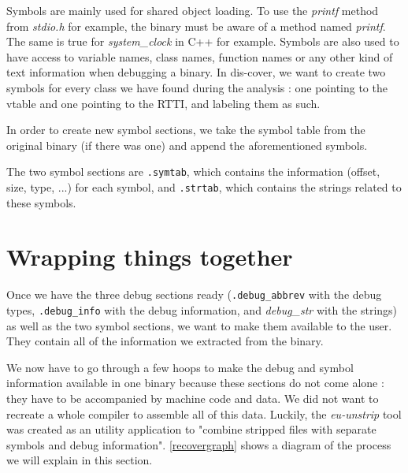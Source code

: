 \documentclass[a4paper,11pt,oneside]{report}
\begin{document}
Symbols are mainly used for shared object loading. To use the \emph{printf}
method from \emph{stdio.h} for example, the binary must be aware of a
method named \emph{printf}. The same is true for
\emph{system\_clock} in C++ for example.
Symbols are also used to have access to variable names, class names, function
names or any other kind of text information when debugging a binary.
In dis-cover, we want to create two symbols for every class we have found
during the analysis : one pointing to the vtable and one pointing to the RTTI,
and labeling them as such.

In order to create new symbol sections, we take the symbol table from the 
original binary (if there was one) and append the aforementioned symbols.

The two symbol sections are \texttt{.symtab}, which contains the information 
(offset, size, type, ...) for each symbol, and \texttt{.strtab}, which contains 
the strings related to these symbols.


\section{Wrapping things together}
\label{wrappingimplementation}

Once we have the three debug sections ready
(\texttt{.debug\_abbrev} with the debug types, \texttt{.debug\_info} with the 
debug information, and \emph{debug\_str} with the strings)
as well as the two symbol sections, we want to make them available to the user.
They contain all of the information we extracted from the binary.

We now have to go through a few hoops to make the debug and symbol information
available in one binary because these sections do not come alone : they have to
be accompanied by machine code and data.
We did not want to recreate a whole compiler to assemble all of this data.
Luckily, the \emph{eu-unstrip} tool was created as an utility application
to "combine stripped files with separate symbols and debug information".
\autoref{recovergraph} shows a diagram of the process we will explain in this
section.
\end{document}
